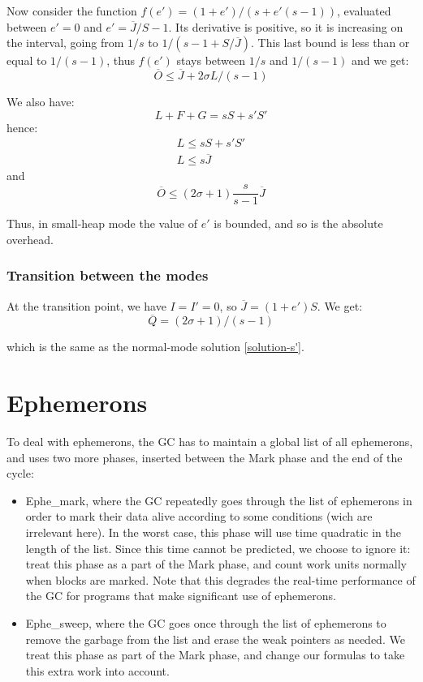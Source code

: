 \documentclass{article}
\begin{document}
Now consider the function $f(e') = (1+e')/(s + e'(s-1))$,
evaluated between $e'=0$ and $e'=\overline{J}/S-1$. Its derivative is
positive, so it is increasing on the interval, going from $1/s$ to
$1/(s-1 + S/\overline{J})$. This last bound is less than or equal to
$1/(s-1)$, thus $f(e')$ stays between $1/s$ and $1/(s-1)$ and we get:
\begin{equation}
\overline{O} \leq \overline{J} + 2\sigma L / (s-1)
\end{equation}

We also have:
\begin{equation}
L + F + G = sS + s'S'
\end{equation}
hence:
\begin{gather*}
L \leq sS + s'S' \\
L \leq s\overline{J}
\end{gather*}
and
\begin{equation}
\overline{O} \leq (2\sigma+1)\frac{s}{s-1}\overline{J}
\end{equation}

Thus, in small-heap mode the value of $e'$ is bounded, and so is the
absolute overhead.


\subsubsection{Transition between the modes}

At the transition point, we have $I = I' = 0$, so
$\overline{J} = (1+e')S$. We get:
\begin{equation}
\overline{Q} = (2\sigma+1) / (s-1)
\end{equation}

which is the same as the normal-mode solution \eqref{solution-s'}.

\section{Ephemerons}

To deal with ephemerons, the GC has to maintain a global list of all
ephemerons, and uses two more phases, inserted between
the Mark phase and the end of the cycle:
\begin{itemize}
\item Ephe\_mark, where the GC repeatedly goes through the list of
ephemerons in order to mark their data alive according to some
conditions (wich are irrelevant here). In the worst case, this phase
will use time quadratic in the length of the list. Since this time
cannot be predicted, we choose to ignore it: treat this phase as a
part of the Mark phase, and count work units normally when blocks are
marked. Note that this degrades the real-time performance of the GC
for programs that make significant use of ephemerons.
\item Ephe\_sweep, where the GC goes once through the list of
ephemerons to remove the garbage from the list and erase the weak
pointers as needed. We treat this phase as part of the Mark phase, and
change our formulas to take this extra work into account.
\end{itemize}
\end{document}
